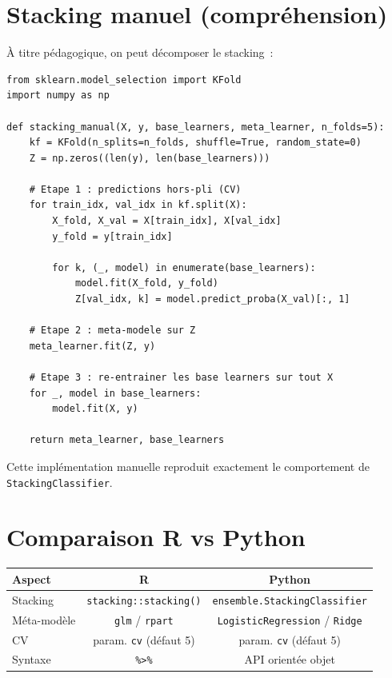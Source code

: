 \documentclass[a4paper,11pt]{article}
\begin{document}
\section{Stacking manuel (compréhension)}

\`A titre p\'edagogique, on peut d\'ecomposer le stacking~:

\begin{lstlisting}
from sklearn.model_selection import KFold
import numpy as np

def stacking_manual(X, y, base_learners, meta_learner, n_folds=5):
    kf = KFold(n_splits=n_folds, shuffle=True, random_state=0)
    Z = np.zeros((len(y), len(base_learners)))
    
    # Etape 1 : predictions hors-pli (CV)
    for train_idx, val_idx in kf.split(X):
        X_fold, X_val = X[train_idx], X[val_idx]
        y_fold = y[train_idx]
        
        for k, (_, model) in enumerate(base_learners):
            model.fit(X_fold, y_fold)
            Z[val_idx, k] = model.predict_proba(X_val)[:, 1]
    
    # Etape 2 : meta-modele sur Z
    meta_learner.fit(Z, y)
    
    # Etape 3 : re-entrainer les base learners sur tout X
    for _, model in base_learners:
        model.fit(X, y)
    
    return meta_learner, base_learners
\end{lstlisting}

\noindent Cette impl\'ementation manuelle reproduit exactement le
comportement de \texttt{StackingClassifier}.

\section{Comparaison R vs Python}

\begin{center}
\begin{tabular}{lcc}
\toprule
Aspect & R & Python \\
\midrule
Stacking & \texttt{stacking::stacking()} & \texttt{ensemble.StackingClassifier} \\
M\'eta-mod\`ele & \texttt{glm} / \texttt{rpart} & \texttt{LogisticRegression} / \texttt{Ridge} \\
CV & param. \texttt{cv} (d\'efaut 5) & param. \texttt{cv} (d\'efaut 5) \\
Syntaxe & \texttt{\%\textgreater{}\%} & API orient\'ee objet \\
\bottomrule
\end{tabular}
\end{center}
\end{document}
